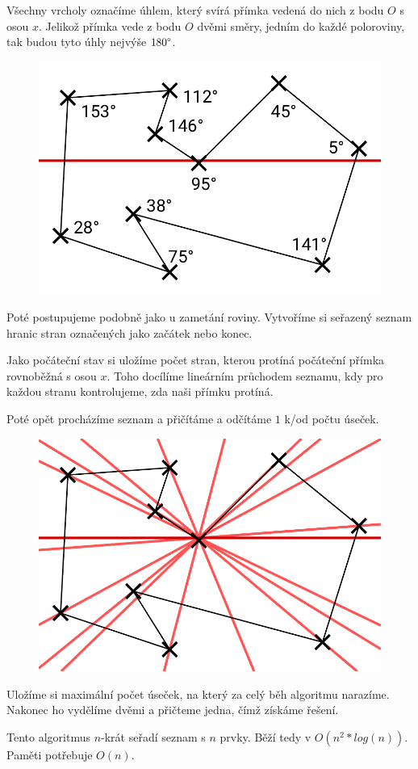 \documentclass{article}
\begin{document}
Všechny vrcholy označíme úhlem, který svírá přímka vedená do nich z bodu \(O\) s osou \(x\). Jelikož přímka vede z bodu \(O\) dvěmi směry, jedním do každé poloroviny, tak budou tyto úhly nejvýše \(180\degree\).

\begin{figure}[H]
    \centering
    \includegraphics[scale=0.5]{swipe001.pdf}
\end{figure}

Poté postupujeme podobně jako u zametání roviny. Vytvoříme si seřazený seznam hranic stran označených jako začátek nebo konec.

Jako počáteční stav si uložíme počet stran, kterou protíná počáteční přímka rovnoběžná s osou \(x\). Toho docílíme lineárním průchodem seznamu, kdy pro každou stranu kontrolujeme, zda naši přímku protíná.

Poté opět procházíme seznam a přičítáme a odčítáme \(1\) k/od počtu úseček.

\begin{figure}[H]
    \centering
    \includegraphics[scale=0.5]{swipe002.pdf}
\end{figure}

Uložíme si maximální počet úseček, na který za celý běh algoritmu narazíme. Nakonec ho vydělíme dvěmi a přičteme jedna, čímž získáme řešení.

Tento algoritmus \(n\)-krát seřadí seznam s \(n\) prvky. Běží tedy v \(O(n^2*log(n))\). Paměti potřebuje \(O(n)\).
\end{document}
